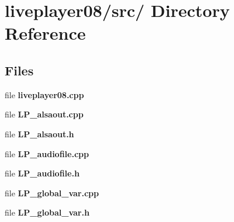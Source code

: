 \section{liveplayer08/src/ Directory Reference}
\label{dir_5915bf9c9b30aa6b2cbd6f86c58d9f23}
\subsection*{Files}
\begin{CompactItemize}
\item 
file {\bf liveplayer08.cpp}
\item 
file {\bf LP\_\-alsaout.cpp}
\item 
file {\bf LP\_\-alsaout.h}
\item 
file {\bf LP\_\-audiofile.cpp}
\item 
file {\bf LP\_\-audiofile.h}
\item 
file {\bf LP\_\-global\_\-var.cpp}
\item 
file {\bf LP\_\-global\_\-var.h}
\end{CompactItemize}
